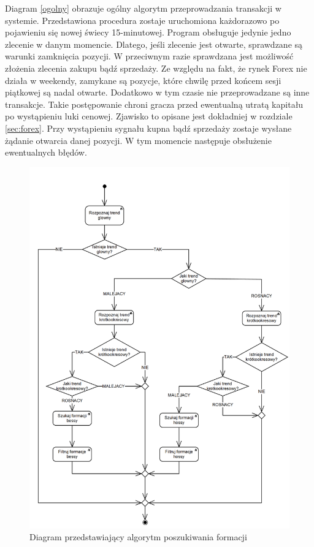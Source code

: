 \documentclass[pdflatex,11pt]{aghdpl}
\begin{document}
Diagram \ref{ogolny} obrazuje ogólny algorytm przeprowadzania transakcji w systemie. Przedstawiona procedura zostaje uruchomiona każdorazowo po pojawieniu się nowej świecy 15-minutowej. Program obsługuje jedynie jedno zlecenie w danym momencie. Dlatego, jeśli zlecenie jest otwarte, sprawdzane są warunki zamknięcia pozycji. W przeciwnym razie sprawdzana jest możliwość złożenia zlecenia zakupu bądź sprzedaży. Ze względu na fakt, że rynek Forex nie działa w weekendy, zamykane są pozycje, które chwilę przed końcem sesji piątkowej są nadal otwarte. Dodatkowo w tym czasie nie przeprowadzane są inne transakcje. Takie postępowanie chroni gracza przed ewentualną utratą kapitału po wystąpieniu luki cenowej. Zjawisko to opisane jest dokładniej w rozdziale \ref{sec:forex}. Przy wystąpieniu sygnału kupna bądź sprzedaży zostaje wysłane żądanie otwarcia danej pozycji. W tym momencie następuje obsłużenie ewentualnych błędów. 

\begin{figure}[H]
\begin{center}
\includegraphics[width=16cm]{warunki_otwarcia.png}
\caption{Diagram przedstawiający algorytm poszukiwania formacji}
\label{warunki_otwarcia}
\end{center}
\end{figure} 
\end{document}
